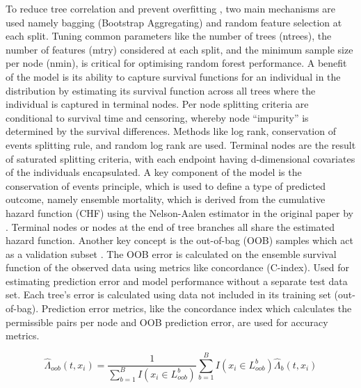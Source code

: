 \noindent To reduce tree correlation and prevent overfitting \parencite{pham_springer_2023}, two main mechanisms are used namely bagging (Bootstrap Aggregating) and random feature selection at each split. Tuning common parameters like the number of trees (ntrees), the number of features (mtry) considered at each split, and the minimum sample size per node (nmin), is critical for optimising random forest performance. A benefit of the model is its ability to capture survival functions for an individual in the distribution by estimating its survival function across all trees where the individual is captured in terminal nodes. Per node splitting criteria are conditional to survival time and censoring, whereby node “impurity” \parencite{ishwaran_random_2008} is determined by the survival differences. Methods like log rank, conservation of events splitting rule, and random log rank are used. Terminal nodes are the result of saturated splitting criteria, with each endpoint having d-dimensional covariates of the individuals encapsulated. A key component of the model is the conservation of events principle, which is used to define a type of predicted outcome, namely ensemble mortality, which is derived from the cumulative hazard function (CHF) using the Nelson-Aalen estimator in the original paper by \parencite{ishwaran_random_2008}. Terminal nodes or nodes at the end of tree branches all share the estimated hazard function. Another key concept is the out-of-bag (OOB) samples which act as a validation subset \parencite{ishwaran_random_2008}. The OOB error is calculated on the ensemble survival function of the observed data using metrics like concordance (C-index). Used for estimating prediction error and model performance without a separate test data set. Each tree's error is calculated using data not included in its training set (out-of-bag). Prediction error metrics, like the concordance index which calculates the permissible pairs per node and OOB prediction error, are used for accuracy metrics. 

\begin{equation} \label{eq:ooberror}
\hat{\Lambda}_{oob}(t,x_{i}) = \frac{1}{\sum_{b=1}^{B}I(x_{i}\in L^{b}_{oob})}\sum_{b=1}^{B}I(x_{i}\in L^{b}_{oob})\hat{\Lambda}_{b}(t,x_{i})
\end{equation}

